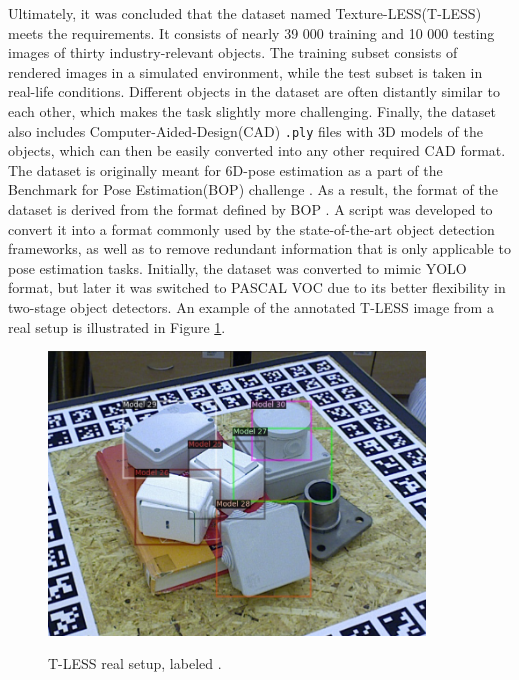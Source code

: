 \documentclass[english, 12pt, a4paper, elec, utf8, a-1b, online]{aaltothesis}
\begin{document}
Ultimately, it was concluded that the dataset named Texture-LESS(T-LESS)  \cite{hodan2017tless} meets the requirements. It consists of nearly 39 000 training and 10 000 testing images of thirty industry-relevant objects. The training subset consists of rendered images in a simulated environment, while the test subset is taken in real-life conditions.  Different objects in the dataset are often distantly similar to each other, which makes the task slightly more challenging. Finally, the dataset also includes Computer-Aided-Design(CAD) \texttt{.ply} files with 3D models of the objects, which can then be easily converted into any other required CAD format. The dataset is originally meant for 6D-pose estimation \cite{hodan2017tless} as a part of the Benchmark for Pose Estimation(BOP) challenge \cite{hodan2018bop}. As a result, the format of the dataset is derived from the format defined by BOP \cite{hodan2018bop_format}. A script was developed to convert it into a format commonly used by the state-of-the-art object detection frameworks, as well as to remove redundant information that is only applicable to pose estimation tasks. Initially, the dataset was converted to mimic YOLO \cite{Redmon2015a} format, but later it was switched to PASCAL VOC due to its better flexibility in two-stage object detectors. An example of the annotated T-LESS image from a real setup is illustrated in Figure \ref{tless_real_example}. 

\begin{figure}[htb]
	\begin{center}
		\includegraphics[width=10cm]{./tless_real_annotated.png}
	\end{center}
	\caption{T-LESS real setup, labeled
\cite{hodan2017tless}.}
	\begin{center}
		\label{tless_real_example}
	\end{center}
\end{figure}
\FloatBarrier
\end{document}
